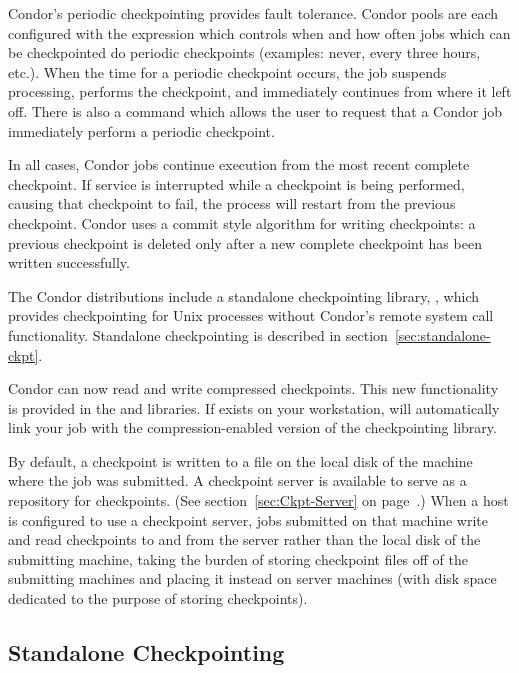 Condor's periodic checkpointing provides fault tolerance.  Condor
pools are each configured with the 
expression which controls when and how often jobs which can be
checkpointed do periodic checkpoints (examples: never, every three
hours, etc.).  When the time for a periodic checkpoint occurs, the job
suspends processing, performs the checkpoint, and immediately
continues from where it left off.  There is also a  command
which allows the user to request that a Condor job immediately perform
a periodic checkpoint.

In all cases, Condor jobs continue execution from the most recent
complete checkpoint.  If service is interrupted while a checkpoint is
being performed, causing that checkpoint to fail, the process will
restart from the previous checkpoint.  Condor uses a commit style
algorithm for writing checkpoints: a previous checkpoint is deleted
only after a new complete checkpoint has been written successfully.

The Condor distributions include a standalone checkpointing library,
, which provides checkpointing for Unix
processes without Condor's remote system call functionality.
Standalone checkpointing is described in
section~\ref{sec:standalone-ckpt}.

Condor can now read and write compressed checkpoints.  This new
functionality is provided in the  and
 libraries.  
If  exists on your workstation, 
will automatically link your job with the compression-enabled version
of the checkpointing library.

By default, a checkpoint is written to a file on the local disk of the
machine where the job was submitted.  A checkpoint server is available
to serve as a repository for checkpoints.  (See
section~\ref{sec:Ckpt-Server} on page~\pageref{sec:Ckpt-Server}.)
When a host is configured to use a checkpoint server, jobs submitted
on that machine write and read checkpoints to and from the server
rather than the local disk of the submitting machine, taking the
burden of storing checkpoint files off of the submitting machines and
placing it instead on server machines (with disk space dedicated to
the purpose of storing checkpoints).

\subsection{\label{sec:standalone-ckpt}Standalone Checkpointing}

